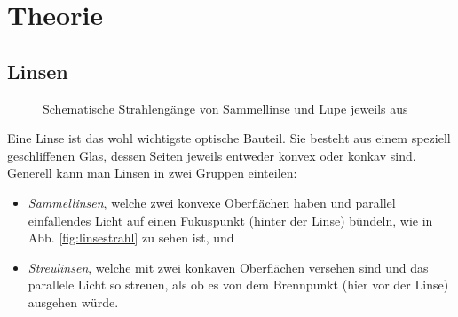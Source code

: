 \documentclass[12pt,a4paper,titlepage,headinclude,bibtotoc]{scrartcl}
\begin{document}
\section{Theorie}
\label{sec:theorie}


\subsection{Linsen}
 \begin{figure}[h]
   \centering
   \hfill
   \caption{Schematische Strahlengänge von Sammellinse und Lupe jeweils aus \protect\cite[6.3.15, 13 Uhr]{lp18}}
   \label{fig:strahl}
 \end{figure}
Eine Linse ist das wohl wichtigste optische Bauteil.
Sie besteht aus einem speziell geschliffenen Glas, dessen Seiten jeweils entweder konvex oder konkav sind.
Generell kann man Linsen in zwei Gruppen einteilen:
\begin{itemize}
\item \emph{Sammellinsen}, welche zwei konvexe Oberflächen haben und parallel einfallendes Licht auf einen Fukuspunkt (hinter der Linse) bündeln, wie in Abb. \ref{fig:linsestrahl} zu sehen ist, und
\item \emph{Streulinsen}, welche mit zwei konkaven Oberflächen versehen sind und das parallele Licht so streuen, als ob es von dem Brennpunkt (hier vor der Linse) ausgehen würde.
\end{itemize}
\end{document}
